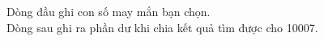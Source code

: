 Dòng đầu ghi con số may mắn bạn chọn.   
\\   Dòng sau ghi ra phần dư khi chia kết quả tìm được cho 10007.  

\